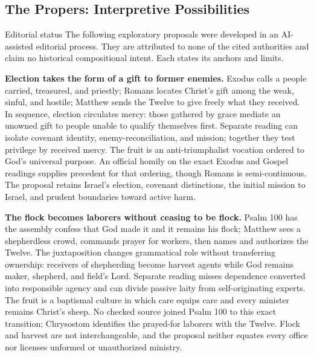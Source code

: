 \begin{deepstudy}
\section*{The Propers: Interpretive Possibilities}

\begin{studybox}{Editorial status}
The following exploratory proposals were developed in an AI-assisted editorial process. They are attributed to none of the cited authorities and claim no historical compositional intent. Each states its anchors and limits.
\end{studybox}

\noindent\textbf{Election takes the form of a gift to former enemies.\enspace{}}
Exodus calls a people carried, treasured, and priestly; Romans locates Christ's gift among the weak, sinful, and hostile; Matthew sends the Twelve to give freely what they received. In sequence, election circulates mercy: those gathered by grace mediate an unowned gift to people unable to qualify themselves first. Separate reading can isolate covenant identity, enemy-reconciliation, and mission; together they test privilege by received mercy. The fruit is an anti-triumphalist vocation ordered to God's universal purpose. An official homily on the exact Exodus and Gospel readings supplies precedent for that ordering, though Romans is semi-continuous. The proposal retains Israel's election, covenant distinctions, the initial mission to Israel, and prudent boundaries toward active harm.

\noindent\textbf{The flock becomes laborers without ceasing to be flock.\enspace{}}
Psalm 100 has the assembly confess that God made it and it remains his flock; Matthew sees a shepherdless crowd, commands prayer for workers, then names and authorizes the Twelve. The juxtaposition changes grammatical role without transferring ownership: receivers of shepherding become harvest agents while God remains maker, shepherd, and field's Lord. Separate reading misses dependence converted into responsible agency and can divide passive laity from self-originating experts. The fruit is a baptismal culture in which care equips care and every minister remains Christ's sheep. No checked source joined Psalm 100 to this exact transition; Chrysostom identifies the prayed-for laborers with the Twelve. Flock and harvest are not interchangeable, and the proposal neither equates every office nor licenses unformed or unauthorized ministry.


\end{deepstudy}
